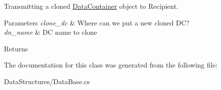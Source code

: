 Transmitting a cloned \hyperlink{class_dwarf_d_b_1_1_data_structures_1_1_data_container}{DataContainer} object to Recipient. 


\begin{DoxyParams}{Parameters}
{\em clone\_\-dc} & Where can we put a new cloned DC?\\
\hline
{\em dn\_\-name} & DC name to clone\\
\hline
\end{DoxyParams}
\begin{DoxyReturn}{Returns}

\end{DoxyReturn}


The documentation for this class was generated from the following file:\begin{DoxyCompactItemize}
\item 
DataStructures/DataBase.cs\end{DoxyCompactItemize}

